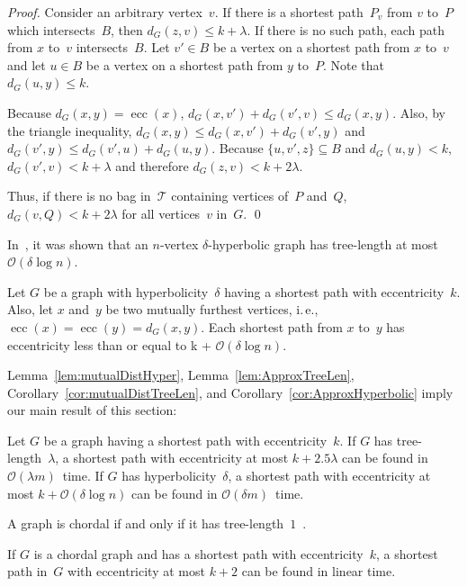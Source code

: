 \documentclass[10pt]{llncs}
\makeatletter
\newcommand{\calO}{\mathcal{O}}
\newcommand{\calT}{\mathcal{T}}
\newcommand{\ie}{i.\,e.\@ifnextchar{,}{}{~}}
\DeclareMathOperator{\ecc}{ecc}
\makeatother
\begin{document}
\begin{proof}
Consider an arbitrary vertex~$v$.
If there is a shortest path~$P_v$ from $v$ to~$P$ which intersects~$B$, then $d_G(z, v) \leq k + \lambda$.
If there is no such path, each path from $x$ to~$v$ intersects~$B$.
Let $v' \in B$ be a vertex on a shortest path from $x$ to~$v$ and let $u \in B$ be a vertex on a shortest path from $y$ to~$P$.
Note that $d_G(u, y) \leq k$.

Because $d_G(x, y) = \ecc(x)$, $d_G(x, v') + d_G(v', v) \leq d_G(x, y)$.
Also, by the triangle inequality, $d_G(x, y) \leq d_G(x, v') + d_G(v', y)$ and $d_G(v', y) \leq d_G(v', u) + d_G(u, y)$.
Because $\{ u, v', z \} \subseteq B$ and $d_G(u, y) < k$, $d_G(v', v) < k + \lambda$ and therefore $d_G(z, v) < k + 2 \lambda$.

Thus, if there is no bag in~$\calT$ containing vertices of~$P$ and~$Q$, $d_G(v, Q) < k + 2 \lambda$ for all vertices~$v$ in~$G$.
\qed
\end{proof}

In~\cite{CheDraEstHab2008}, it was shown that an $n$-vertex $\delta$-hyperbolic graph has tree-length at most~$\calO(\delta \log n)$.

\begin{corollary}
    \label{cor:ApproxHyperbolic}
Let $G$ be a graph with hyperbolicity~$\delta$ having a shortest path with eccentricity~$k$.
Also, let $x$ and~$y$ be two mutually furthest vertices, \ie, $\ecc(x) = \ecc(y) = d_G(x, y)$.
Each shortest path from $x$ to~$y$ has eccentricity less than or equal to k + $\calO(\delta \log n)$.
\end{corollary}

Lemma~\ref{lem:mutualDistHyper}, Lemma~\ref{lem:ApproxTreeLen}, Corollary~\ref{cor:mutualDistTreeLen}, and Corollary~\ref{cor:ApproxHyperbolic} imply our main result of this section:

\begin{theorem}
Let $G$ be a graph having a shortest path with eccentricity~$k$.
If $G$ has tree-length~$\lambda$, a shortest path with eccentricity at most $k + 2.5\lambda$ can be found in $\calO(\lambda m)$~time.
If $G$ has hyperbolicity~$\delta$, a shortest path with eccentricity at most $k + \calO(\delta \log n)$ can be found in $\calO(\delta m)$~time.
\end{theorem}

A graph is chordal if and only if it has tree-length~$1$~\cite{Gavril1974}.

\begin{corollary}
If $G$ is a chordal graph and has a shortest path with eccentricity~$k$, a shortest path in~$G$ with eccentricity at most $k + 2$ can be found in linear time.
\end{corollary}
\end{document}
